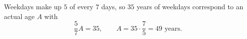 Weekdays make up $5$ of every $7$ days, so $35$ years of weekdays correspond to an actual age $A$ with
\[\dfrac57A=35,\qquad A=35\cdot\dfrac75=\boxed{49}\text{ years}.\]
